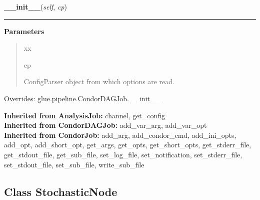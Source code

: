     \begin{boxedminipage}{\textwidth}

    \raggedright \textbf{\_\_init\_\_}(\textit{self}, \textit{cp})

    \vspace{-1.5ex}

    \rule{\textwidth}{0.5\fboxrule}
    \vspace{1ex}

      \textbf{Parameters}
      \begin{quote}
        \begin{Ventry}{xx}

          \item[cp]

          ConfigParser object from which options are read.

        \end{Ventry}

      \end{quote}

    \vspace{1ex}

      Overrides: glue.pipeline.CondorDAGJob.\_\_init\_\_

    \end{boxedminipage}

  \textbf{Inherited from AnalysisJob:}
    channel,
    get\_config
    \\
  \textbf{Inherited from CondorDAGJob:}
    add\_var\_arg,
    add\_var\_opt
    \\
  \textbf{Inherited from CondorJob:}
    add\_arg,
    add\_condor\_cmd,
    add\_ini\_opts,
    add\_opt,
    add\_short\_opt,
    get\_args,
    get\_opts,
    get\_short\_opts,
    get\_stderr\_file,
    get\_stdout\_file,
    get\_sub\_file,
    set\_log\_file,
    set\_notification,
    set\_stderr\_file,
    set\_stdout\_file,
    set\_sub\_file,
    write\_sub\_file


\subsection{Class StochasticNode}

